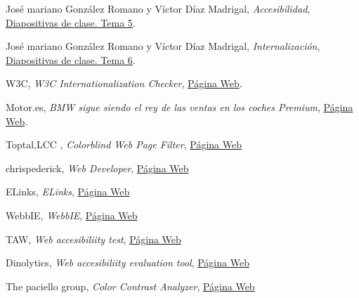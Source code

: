 \documentclass[a4paper,11pt]{article}
\begin{document}
\begin{thebibliography}{99}
José mariano González Romano y Víctor Díaz Madrigal,
\textit{Accesibilidad},
\href{https://s3-eu-central-1.amazonaws.com/learn-eu-central-1-prod-fleet01-xythos/5ac734ed505df/2113026?response-content-disposition=inline%3B%20filename%2A%3DUTF-8%27%27IPO-2018-19-05-Accesibilidad.pdf&response-content-type=application%2Fpdf&X-Amz-Algorithm=AWS4-HMAC-SHA256&X-Amz-Date=20181204T121814Z&X-Amz-SignedHeaders=host&X-Amz-Expires=21600&X-Amz-Credential=AKIAIZ3QX2YUHH4EOO3A%2F20181204%2Feu-central-1%2Fs3%2Faws4_request&X-Amz-Signature=c47e51bae64476cffa8186f4f4bb7c40257eac45d1f2a68b63e6b66dbc5a1609}{Diapositivas de clase. Tema 5}.

José mariano González Romano y Víctor Díaz Madrigal,
\textit{Internalización},
\href{https://s3-eu-central-1.amazonaws.com/learn-eu-central-1-prod-fleet01-xythos/5ac734ed505df/2214811?response-content-disposition=inline%3B%20filename%2A%3DUTF-8%27%27IPO-2018-19-06-Internacionalizaci%25C3%25B3n.pdf&response-content-type=application%2Fpdf&X-Amz-Algorithm=AWS4-HMAC-SHA256&X-Amz-Date=20181204T121848Z&X-Amz-SignedHeaders=host&X-Amz-Expires=21600&X-Amz-Credential=AKIAIZ3QX2YUHH4EOO3A%2F20181204%2Feu-central-1%2Fs3%2Faws4_request&X-Amz-Signature=e7b08ac13f1e9819a1a8f39938e1176631bfe0cf869f6b30b0e687b6a0efa442}{Diapositivas de clase. Tema 6}.

W3C,
\textit{W3C Internationalization Checker},
\href{http://validator.w3.org/i18n-checker/}{Página Web}.

Motor.es,
\textit{BMW sigue siendo el rey de las ventas en los coches Premium},
\href{https://www.motor.es/noticias/bmw-sigue-siendo-el-rey-de-las-ventas-en-los-coches-premium.php}{Página Web}.


Toptal,LCC ,
\textit{Colorblind Web Page Filter},
\href{https://www.toptal.com/designers/colorfilter}{Página Web}

chrispederick,
\textit{Web Developer},
\href{https://addons.mozilla.org/es/firefox/addon/web-developer/}{Página Web}


ELinks,
\textit{ELinks},
\href{http://elinks.or.cz/}{Página Web}

WebbIE,
\textit{WebbIE},
\href{http://www.webbie.org.uk/es/}{Página Web}


TAW,
\textit{Web accesibiliity test},
\href{https://www.tawdis.net/}{Página Web}

Dinolytics,
\textit{Web accesibiliity evaluation tool},
\href{https://wave.webaim.org/}{Página Web}

The paciello group,
\textit{Color Contrast Analyzer},
\href{https://developer.paciellogroup.com/resources/contrastanalyser/}{Página Web}


\end{thebibliography}
\end{document}
